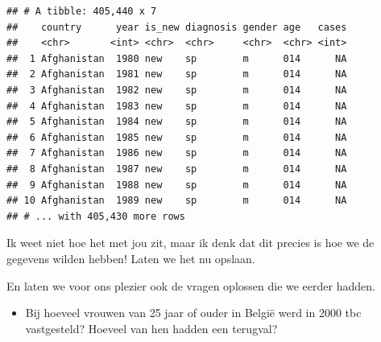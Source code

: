 \documentclass[]{tufte-book}
\newenvironment{Shaded}{}{}
\newcommand{\DataTypeTok}[1]{\textcolor[rgb]{0.56,0.13,0.00}{#1}}
\newcommand{\DecValTok}[1]{\textcolor[rgb]{0.25,0.63,0.44}{#1}}
\newcommand{\KeywordTok}[1]{\textcolor[rgb]{0.00,0.44,0.13}{\textbf{#1}}}
\newcommand{\NormalTok}[1]{#1}
\newcommand{\OperatorTok}[1]{\textcolor[rgb]{0.40,0.40,0.40}{#1}}
\newcommand{\StringTok}[1]{\textcolor[rgb]{0.25,0.44,0.63}{#1}}
\providecommand{\tightlist}{%
  \setlength{\itemsep}{0pt}\setlength{\parskip}{0pt}}
\begin{document}
\begin{verbatim}
## # A tibble: 405,440 x 7
##    country      year is_new diagnosis gender age   cases
##    <chr>       <int> <chr>  <chr>     <chr>  <chr> <int>
##  1 Afghanistan  1980 new    sp        m      014      NA
##  2 Afghanistan  1981 new    sp        m      014      NA
##  3 Afghanistan  1982 new    sp        m      014      NA
##  4 Afghanistan  1983 new    sp        m      014      NA
##  5 Afghanistan  1984 new    sp        m      014      NA
##  6 Afghanistan  1985 new    sp        m      014      NA
##  7 Afghanistan  1986 new    sp        m      014      NA
##  8 Afghanistan  1987 new    sp        m      014      NA
##  9 Afghanistan  1988 new    sp        m      014      NA
## 10 Afghanistan  1989 new    sp        m      014      NA
## # ... with 405,430 more rows
\end{verbatim}

Ik weet niet hoe het met jou zit, maar ik denk dat dit precies is hoe we de gegevens wilden hebben! Laten we het nu opslaan.

\begin{Shaded}
\end{Shaded}

En laten we voor ons plezier ook de vragen oplossen die we eerder hadden.

\begin{itemize}
\tightlist
\item
  Bij hoeveel vrouwen van 25 jaar of ouder in België werd in 2000 tbc vastgesteld? Hoeveel van hen hadden een terugval?
\end{itemize}
\end{document}
